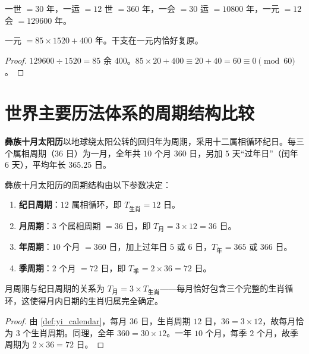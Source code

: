\begin{definition}[元会运世]\label{def:yuan_hui_yun_shi}
一世 \(=30\) 年，一运 \(=12\) 世 \(=360\) 年，一会 \(=30\) 运 \(=10800\) 年，一元 \(=12\) 会 \(=129600\) 年。
\end{definition}

\begin{theorem}[轩辕历法与元会运世的周期对应]\label{thm:xuanyuan_yuanhuiyunshi}
一元 \(=85\times 1520+400\) 年。干支在一元内恰好复原。
\end{theorem}

\begin{proof}
\(129600\div 1520=85\) 余 \(400\)。\(85\times 20+400\equiv 20+40=60\equiv 0\pmod{60}\)。
\end{proof}

\section{世界主要历法体系的周期结构比较}
\label{sec:world_calendars}

\begin{definition}[彝族十月太阳历]\label{def:yi_calendar}
\textbf{彝族十月太阳历}以地球绕太阳公转的回归年为周期，采用十二属相循环纪日。每三个属相周期（\(36\) 日）为一月，全年共 \(10\) 个月 \(360\) 日，另加 \(5\) 天“过年日”（闰年 \(6\) 天），平均年长 \(365.25\) 日。
\end{definition}

\begin{proposition}[彝族十月历的周期结构]\label{prop:yi_calendar_structure}
彝族十月太阳历的周期结构由以下参数决定：
\begin{enumerate}[label=(\roman*)]
    \item \textbf{纪日周期}：\(12\) 属相循环，即 \(T_{\text{生肖}}=12\) 日。
    \item \textbf{月周期}：\(3\) 个属相周期 \(=36\) 日，即 \(T_{\text{月}}=3\times 12=36\) 日。
    \item \textbf{年周期}：\(10\) 个月 \(=360\) 日，加上过年日 \(5\) 或 \(6\) 日，\(T_{\text{年}}=365\) 或 \(366\) 日。
    \item \textbf{季周期}：\(2\) 个月 \(=72\) 日，即 \(T_{\text{季}}=2\times 36=72\) 日。
\end{enumerate}
月周期与纪日周期的关系为 \(T_{\text{月}}=3\times T_{\text{生肖}}\)——每月恰好包含三个完整的生肖循环，这使得月内日期的生肖归属完全确定。
\end{proposition}

\begin{proof}
由 \cref{def:yi_calendar}，每月 \(36\) 日，生肖周期 \(12\) 日，\(36=3\times 12\)，故每月恰为 \(3\) 个生肖周期。同理，全年 \(360=30\times 12\)。一年 \(10\) 个月，每季 \(2\) 个月，故季周期为 \(2\times 36=72\) 日。
\end{proof}

